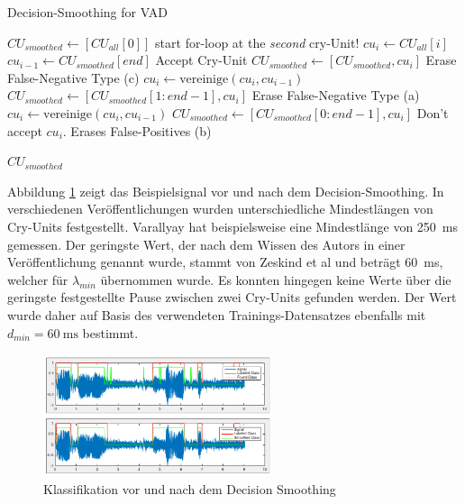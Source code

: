 \begin{algorithm}[h]
	\caption{Decision-Smoothing for VAD}
	\label{alg:decisionSmoothing}
	\begin{algorithmic}[1]
		\State $CU_{smoothed} \gets[CU_{all}[0]] $
		\State \Comment start for-loop at the \emph{second} cry-Unit!
			\State $cu_i \gets CU_{all}[i]$
			\State $cu_{i-1} \gets CU_{smoothed}[end]$
			\State \Comment Accept Cry-Unit
					\State $CU_{smoothed} \gets [CU_{smoothed}, cu_i] $
			\Else
					\State \Comment Erase False-Negative Type (c)
					\State $cu_i \gets \text{vereinige}(cu_i, cu_{i-1})$
					\State $CU_{smoothed} \gets [CU_{smoothed}[1:end-1], cu_i] $
			\EndIf
			\Else
			\State \Comment Erase False-Negative Type (a)
			\State $cu_i \gets \text{vereinige}(cu_i, cu_{i-1})$
			\State $CU_{smoothed} \gets [CU_{smoothed}[0:end-1], cu_i] $
			\Else
			\State \Comment Don't accept $cu_i$. Erases False-Positives (b)
			\EndIf
			\EndIf
		\EndFor
		
		\Return $CU_{smoothed}$
		\EndFunction
		
	\end{algorithmic}
\end{algorithm}

Abbildung \ref{img:after-smoothing} zeigt das Beispielsignal vor und nach dem Decision-Smoothing. In verschiedenen Veröffentlichungen wurden unterschiedliche Mindestlängen von Cry-Units festgestellt. Varallyay \cite[S. 8]{cry_thesis} hat beispielsweise eine Mindestlänge von \SI{250}{\milli\second} gemessen. Der geringste Wert, der nach dem Wissen des Autors in einer Veröffentlichung genannt wurde, stammt von Zeskind et al \cite[S. 325]{rythmic} und beträgt  \SI{60}{\milli\second}, welcher für $\lambda_{min}$ übernommen wurde. Es konnten hingegen keine Werte über die geringste festgestellte Pause zwischen zwei Cry-Units gefunden werden. Der Wert wurde daher auf Basis des verwendeten Trainings-Datensatzes ebenfalls mit $d_{min} = \SI{60}{\milli\second}$ bestimmt. 

\begin{figure}[h]
	\centering
	\includegraphics[width=0.6\textwidth]{bilder/smoothing04.png}
	\caption{Klassifikation vor und nach dem Decision Smoothing}
	\label{img:after-smoothing}
\end{figure}

